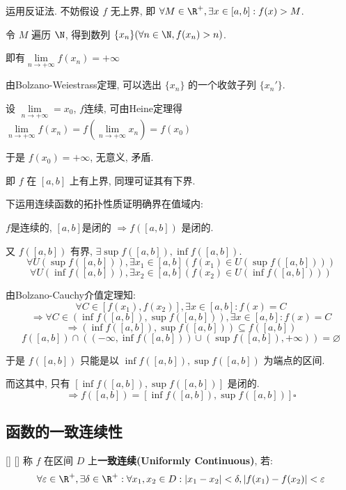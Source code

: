 \documentclass[UTF8]{ctexart}
\begin{document}
			\begin{prf}

				运用反证法. 不妨假设 \(f\) 无上界, 即 \(\forall M\in\R^+, \exists x\in[a,b]:f(x)>M\). 

				令 \(M\) 遍历 \(\N\), 得到数列 \(\{x_n\}(\forall n\in\N, f(x_n)>n)\). 
				
				即有\(\lim\limits_{n\to+\infty}f(x_n)=+\infty\)

				由Bolzano-Weiestrass定理, 可以选出 \(\{x_n\}\) 的一个收敛子列 \(\{x_n'\}\). 
				
				设 \(\lim\limits_{n\to+\infty}=x_0\), \(f\)连续, 可由Heine定理得\(\lim\limits_{n\to+\infty}f(x_n)=f(\lim\limits_{n\to+\infty}x_n)=f(x_0)\)

				于是 \(f(x_0)=+\infty\), 无意义, 矛盾. 
				
				即 \(f\) 在 \([a,b]\) 上有上界, 同理可证其有下界. 

				下运用连续函数的拓扑性质证明确界在值域内: 

				\(f\)是连续的, \([a,b]\)是闭的 \(\Longrightarrow f([a,b])\) 是闭的. 

				又 \(f([a,b])\) 有界, \(\exists\sup f([a,b]),\inf f([a,b])\). 
				\[\forall U(\sup f([a,b])), \exists x_1\in[a,b](f(x_1)\in U(\sup f([a,b])))\]
				\[\forall U(\inf f([a,b])), \exists x_2\in[a,b](f(x_2)\in U(\inf f([a,b])))\]
				
				由Bolzano-Cauchy介值定理知: 
				\[\forall C\in[f(x_1),f(x_2)], \exists x\in[a,b]: f(x)=C\]
				\[\Longrightarrow\forall C\in(\inf f([a,b]),\sup f([a,b])), \exists x\in[a,b]: f(x)=C\]
				\[\Longrightarrow (\inf f([a,b]),\sup f([a,b]))\subseteq f([a,b])\]
				\[f([a,b])\cap((-\infty,\inf f([a,b]))\cup(\sup f([a,b]),+\infty))=\varnothing\]

				于是 \(f([a,b])\) 只能是以 \(\inf f([a,b]),\sup f([a,b])\) 为端点的区间. 

				而这其中, 只有 \([\inf f([a,b]),\sup f([a,b])]\) 是闭的. 
				\[\Longrightarrow f([a,b])=[\inf f([a,b]),\sup f([a,b])]\square\]
                \end{prf}
			
		\subsection{函数的一致连续性}
			
			\begin{dfn}
			    []
			    {}
			    []
			    []
				称 \(f\) 在区间 \(D\) 上\textbf{一致连续(Uniformly Continuous)}, 若: 
				\[\forall\varepsilon\in\R^+, \exists\delta\in\R^+: \forall x_1,x_2\in D: |x_1-x_2|<\delta, |f(x_1)-f(x_2)|<\varepsilon\]
			\end{dfn}
			
\end{document}

